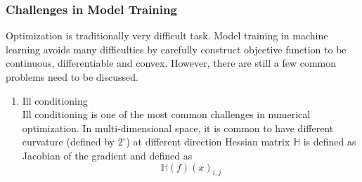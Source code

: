 \subsubsection{Challenges in Model Training}

Optimization is traditionally very difficult task. Model training in machine learning avoids many difficulties by carefully construct objective function to be continuous, differentiable and convex. However, there are still a few common problems need to be discussed. 

\begin{enumerate}
    \item Ill conditioning\\
Ill conditioning is one of the most common challenges in numerical optimization. In multi-dimensional space, it is common to have different curvature (defined by $2^\circ$) at different direction
Hessian matrix $\mathbb{H}$ is defined as Jacobian of the gradient and defined as 
\begin{equation}
    \mathbb{H}(f)(x)_{i,j}
\end{equation}
\end{enumerate}

